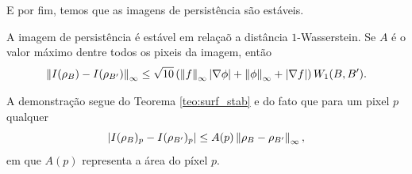 E por fim, temos que as imagens de persistência são estáveis.
\begin{teo}
    A imagem de persistência é estável em relaçaõ a distância $1$-Wasserstein. Se $A$ é o valor máximo dentre 
    todos os pixeis da imagem, então 
    \begin{equation}
        \left\lVert I(\rho_B) - I(\rho_{B'})\right\rVert_\infty \leq 
        \sqrt{10} \left( \left\lVert f\right\rVert_\infty \left\lvert\nabla \phi\right\rvert + \left\lVert\phi\right\rVert_\infty + \left\lvert\nabla f\right\rvert\right) W_1(B,B').
    \end{equation}
\end{teo}
\begin{demonstracao}
  A demonstração segue do Teorema \ref{teo:surf_stab} e do fato que para um pixel $p$ qualquer 
  \begin{equation*}
    \left\lvert I(\rho_B)_p - I(\rho_{B'})_p\right\rvert \leq A(p) \left\lVert\rho_B - \rho_{B'}\right\rVert_\infty,
  \end{equation*}
  em que $A(p)$ representa a área do píxel $p$. 
\end{demonstracao}

